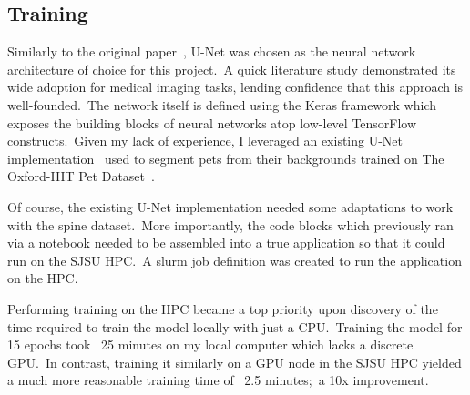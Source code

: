 \documentclass[conference]{IEEEtran}
\begin{document}
    \subsection{Training}\label{subsec:training}

    Similarly to the original paper~\cite{cobb-angle-measurement-of-spine-from-x-ray-images-using-convolutional-neural-network}, U-Net was chosen as the neural network architecture of choice for this project.\ A quick literature study demonstrated its wide adoption for medical imaging tasks, lending confidence that this approach is well-founded.\ The network itself is defined using the Keras framework which exposes the building blocks of neural networks atop low-level TensorFlow constructs.\ Given my lack of experience, I leveraged an existing U-Net implementation~\cite{image-segmentation-with-a-u-net-like-architecture} used to segment pets from their backgrounds trained on The Oxford-IIIT Pet Dataset~\cite{pets-dataset}.

    Of course, the existing U-Net implementation needed some adaptations to work with the spine dataset.\ More importantly, the code blocks which previously ran via a notebook needed to be assembled into a true application so that it could run on the SJSU HPC.\ A slurm job definition was created to run the application on the HPC\@.

    Performing training on the HPC became a top priority upon discovery of the time required to train the model locally with just a CPU.\ Training the model for 15 epochs took ~25 minutes on my local computer which lacks a discrete GPU.\ In contrast, training it similarly on a GPU node in the SJSU HPC yielded a much more reasonable training time of ~2.5 minutes;\ a 10x improvement.
\end{document}
